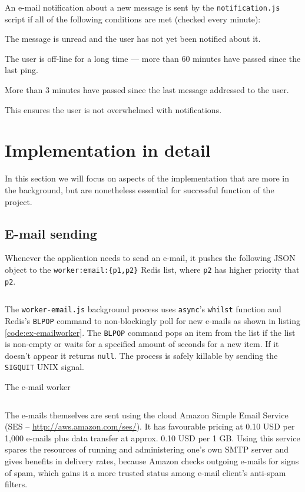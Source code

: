 \documentclass[12pt,oneside]{fithesis}
\begin{document}
	  An e-mail notification about a new message is sent by the \texttt{notification.js} script if all of the following conditions are met (checked every minute):
	  \begin{compactitem}
	  	\item The message is unread and the user has not yet been notified about it.
	    \item The user is off-line for a long time --- more than 60 minutes have passed since the last ping.
	    \item More than 3 minutes have passed since the last message addressed to the user.
	  \end{compactitem}
	  This ensures the user is not overwhelmed with notifications.
\section{Implementation in detail}
	In this section we will focus on aspects of the implementation that are more in the background, but are nonetheless essential for successful function of the project.
	\subsection{E-mail sending}
		\label{section:email}
		Whenever the application needs to send an e-mail, it pushes the following JSON object to the \texttt{worker:email:\{p1,p2\}} Redis list, where \texttt{p2} has higher priority that \texttt{p2}.
		\inputminted[fontsize=\footnotesize, linenos=false]{javascript}{ex-emailobj.js}
		
		The \texttt{worker-email.js} background process uses \texttt{async}'s \texttt{whilst} function and Redis's \texttt{BLPOP} command to non-blockingly poll for new e-mails as shown in listing \ref{code:ex-emailworker}. The \texttt{BLPOP} command pops an item from the list if the list is non-empty or waits for a specified amount of seconds for a new item. If it doesn't appear it returns \texttt{null}. The process is safely killable by sending the \texttt{SIGQUIT} UNIX signal.
		
		\begin{program}[h]
		\caption{The e-mail worker}
		\label{code:ex-emailworker}
		\inputminted[fontsize=\footnotesize, linenos=false]{javascript}{ex-emailworker.js}
		\end{program}
		
		The e-mails themselves are sent using the cloud Amazon Simple Email Service (SES -- \url{http://aws.amazon.com/ses/}). It has favourable pricing at 0.10 USD per 1,000 e-mails plus data transfer at approx. 0.10 USD per 1 GB. Using this service spares the resources of running and administering one's own SMTP server and gives benefits in delivery rates, because Amazon checks outgoing e-mails for signs of spam, which gains it a more trusted status among e-mail client's anti-spam  filters.
\end{document}
